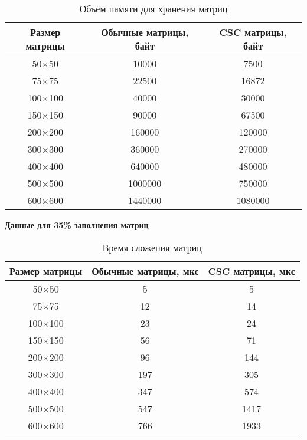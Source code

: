 \begin{table}[H]
	\centering
	\caption{Объём памяти для хранения матриц}
	\begin{tabular}{|c|c|c|}
		\hline
		Размер матрицы & Обычные матрицы, байт & CSC матрицы, байт \\ \hline
		50$\times$50         & 10000                 & 7500             \\ \hline
		75$\times$75         & 22500                 & 16872             \\ \hline
		100$\times$100        & 40000                 & 30000             \\ \hline
		150$\times$150        & 90000                 & 67500            \\ \hline
		200$\times$200        & 160000                & 120000            \\ \hline
		300$\times$300        & 360000                & 270000            \\ \hline
		400$\times$400        & 640000                & 480000           \\ \hline
		500$\times$500        & 1000000               & 750000           \\ \hline
		600$\times$600        & 1440000               & 1080000           \\ \hline
	\end{tabular}
\end{table}


\newpage
\textbf{Данные для 35\% заполнения матриц}
\begin{table}[H]
	\centering
	\caption{Время сложения матриц}
	\begin{tabular}{|c|c|c|}
		\hline
		Размер матрицы & Обычные матрицы, мкс & CSC матрицы, мкс \\ \hline
		50$\times$50         & 5                    & 5                \\ \hline
		75$\times$75         & 12                   & 14                \\ \hline
		100$\times$100        & 23                   & 24                \\ \hline
		150$\times$150        & 56                   & 71               \\ \hline
		200$\times$200        & 96                   & 144               \\ \hline
		300$\times$300        & 197                  & 305               \\ \hline
		400$\times$400        & 347                  & 574              \\ \hline
		500$\times$500        & 547                  & 1417              \\ \hline
		600$\times$600        & 766                  & 1933              \\ \hline
	\end{tabular}
\end{table}

